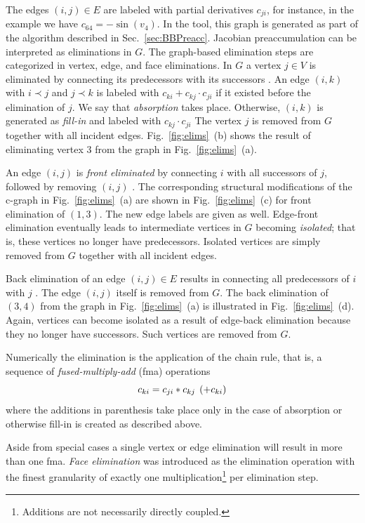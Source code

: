 \documentclass{book}
\newcommand{\refsec}[1]{{Sec.~\ref{#1}}}
\newcommand{\reffig}[1]{{Fig.~\ref{#1}}}
\begin{document}
The edges $(i,j)\in E$ are labeled with partial derivatives
$c_{ji}$, for instance, in the 
example we have $c_{64}=-\sin(v_4)$.
In the tool, this graph is generated as part of the algorithm described in 
\refsec{sec:BBPreacc}.
Jacobian preaccumulation can be interpreted as eliminations in $G$.
The graph-based elimination steps are categorized in vertex, edge, and face 
eliminations. 
In $G$ a vertex $j \in V$ is eliminated by connecting its predecessors with
its successors \cite{GrRe91}.
An edge $(i,k)$ with
$i \prec j$ and $j \prec k$ is labeled with
$c_{ki}+c_{kj} \cdot c_{ji}$ if it existed before the elimination of $j.$
We say that {\em absorption} takes place.
Otherwise, $(i,k)$ is generated as {\em fill-in} and labeled
with $c_{kj} \cdot c_{ji}$
The vertex $j$ is removed from
$G$ together with all incident edges. 
\reffig{fig:elims}~(b) shows the result of eliminating vertex $3$
from the graph in \reffig{fig:elims}~(a).

An edge $(i,j)$ is {\em front eliminated} by connecting $i$ with all successors
of $j$, followed by removing $(i,j)$ \cite{Nau00a}.
The corresponding structural modifications of the c-graph in
\reffig{fig:elims}~(a) are shown in
\reffig{fig:elims}~(c) for front elimination of $(1,3).$
The new edge labels are given as well.
Edge-front elimination eventually leads to intermediate vertices in $G$
becoming
{\em isolated}; that is, these vertices no longer have predecessors.
Isolated vertices are simply removed from $G$ together
with all incident edges.

Back elimination of an edge
$(i,j) \in E$ results in connecting all predecessors of $i$
with $j$ \cite{Nau00a}.
The edge $(i,j)$ itself is removed from $G.$
The back elimination of $(3,4)$ from the graph in \reffig{fig:elims}~(a) 
is illustrated in \reffig{fig:elims}~(d). 
Again, vertices can become isolated as a result of edge-back elimination
because they no longer have successors.
Such vertices are removed from $G.$

Numerically the elimination is the application of 
the chain rule, that is, a sequence of {\em fused-multiply-add} (fma) operations
\begin{equation}\label{eqn:fma}
  c_{ki}=c_{ji}*c_{kj}\hspace*{1ex}(+c_{ki}) 
\end{equation}
where the additions in parenthesis take place only  in the case of 
absorption or otherwise fill-in is created 
as described above.

Aside from special cases a single vertex or edge elimination will result in more
than one fma. {\em Face elimination} was introduced 
as the elimination operation with the finest granularity of exactly 
one multiplication\footnote{Additions are not necessarily directly coupled.} 
per elimination step.
\end{document}
